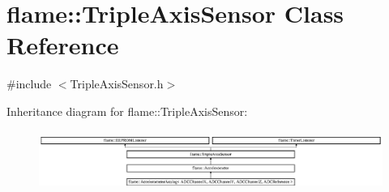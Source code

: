 \hypertarget{classflame_1_1_triple_axis_sensor}{\section{flame\-:\-:Triple\-Axis\-Sensor Class Reference}
\label{classflame_1_1_triple_axis_sensor}
}


{\ttfamily \#include $<$Triple\-Axis\-Sensor.\-h$>$}

Inheritance diagram for flame\-:\-:Triple\-Axis\-Sensor\-:\begin{figure}[H]
\begin{center}
\leavevmode
\includegraphics[height=1.982301cm]{classflame_1_1_triple_axis_sensor}
\end{center}
\end{figure}
